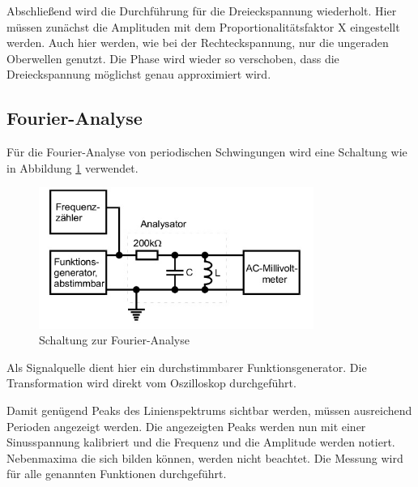 Abschließend wird die Durchführung für die Dreieckspannung wiederholt. Hier müssen
zunächst die Amplituden mit dem Proportionalitätsfaktor X eingestellt werden.
Auch hier werden, wie bei der Rechteckspannung, nur die ungeraden Oberwellen
genutzt. Die Phase wird wieder so verschoben, dass die Dreieckspannung möglichst
genau approximiert wird.
\subsection{Fourier-Analyse}
Für die Fourier-Analyse von periodischen Schwingungen wird eine Schaltung wie in
Abbildung \ref{fig:ana} verwendet.
\begin{figure}[h]
  \centering
  \includegraphics[width=0.8\textwidth]{bilder/analyse.jpg}
  \caption{Schaltung zur Fourier-Analyse\,\cite{351}}
  \label{fig:ana}
\end{figure}
Als Signalquelle dient hier ein durchstimmbarer Funktionsgenerator. Die
Transformation wird direkt vom Oszilloskop durchgeführt.

Damit genügend Peaks des Linienspektrums sichtbar werden, müssen ausreichend
Perioden angezeigt werden. Die angezeigten Peaks werden nun mit einer
Sinusspannung kalibriert und die Frequenz und die Amplitude werden notiert.
Nebenmaxima die sich bilden können, werden nicht beachtet. Die Messung wird für
alle genannten Funktionen durchgeführt.
